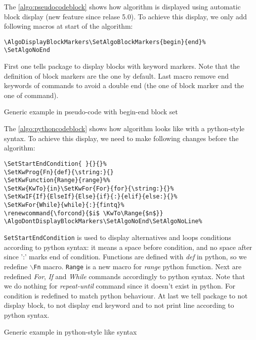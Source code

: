 \documentclass[a4paper]{article}
\begin{document}
The \autoref{algo:pseudocodeblock} shows how algorithm is displayed using automatic block
display (new feature since relase 5.0). To achieve this display, we only add following
macros at start of the algorithm:\vspace{-1.5ex}
\begin{verbatim}
\AlgoDisplayBlockMarkers\SetAlgoBlockMarkers{begin}{end}%
\SetAlgoNoEnd
\end{verbatim}
\vspace{-1.5ex}First one tells package to display blocks with keyword markers. Note that
the definition of block markers are the one by default. Last macro remove end keywords of
commands to avoid a double end (the one of block marker and the one of command).
\begin{algorithm}\AlgoDisplayBlockMarkers\SetAlgoNoEnd{}
  \caption{Generic example in pseudo-code with begin-end block set}\label{algo:pseudocodeblock}
  
\end{algorithm}\medskip

The \autoref{algo:pythoncodeblock} shows how algorithm looks like with a python-style
syntax. To achieve this display, we need to make following changes before the algorithm:\vspace{-1.5ex}
\begin{verbatim}
\SetStartEndCondition{ }{}{}%
\SetKwProg{Fn}{def}{\string:}{}
\SetKwFunction{Range}{range}%%
\SetKw{KwTo}{in}\SetKwFor{For}{for}{\string:}{}%
\SetKwIF{If}{ElseIf}{Else}{if}{:}{elif}{else:}{}%
\SetKwFor{While}{while}{:}{fintq}%
\renewcommand{\forcond}{$i$ \KwTo\Range{$n$}}
\AlgoDontDisplayBlockMarkers\SetAlgoNoEnd\SetAlgoNoLine%
\end{verbatim}
\vspace{-1.5ex}\texttt{SetStartEndCondition} is used to display alternatives and loops
conditions according to python syntax: it means a space before condition, and no space
after since ':' marks end of condition. Functions are defined with \emph{def} in python,
so we redefine \texttt{$\backslash$Fn} macro. \texttt{Range} is a new macro for
\emph{range} python function. Next are redefined \emph{For}, \emph{If} and \emph{While}
commands accordingly to python syntax. Note that we do nothing for \emph{repeat-until}
command since it doesn't exist in python. For condition is redefined to match python
behaviour. At last we tell package to not display block, to
not display end keyword and to not print line according to python syntax.%
\renewcommand{\forcond}{$i$ \KwTo\Range{$n$}}
\begin{algorithm} \AlgoDontDisplayBlockMarkers\SetAlgoNoEnd\SetAlgoNoLine%
  \SetStartEndCondition{ }{}{}%
  \caption{Generic example in python-style like syntax}\label{algo:pythoncodeblock}
  
\end{algorithm}
\end{document}
